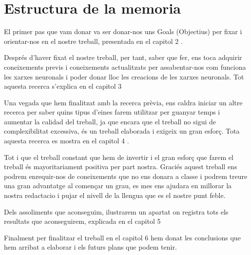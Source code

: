 \section{Estructura de la memoria}\label{sec:Estructura de la memoria}

El primer pas que vam donar va ser donar-nos uns Goals (Objectius) per fixar i orientar-nos en el nostre treball, presentada en el capitol 2 .

Després d'haver fixat el nostre treball, per tant, saber que fer, ens toca adquirir coneixements previs i coneixements actualitzats per assabentar-nos com funciona les xarxes neuronals i poder donar lloc les creacions de les xarxes neuronals. Tot aquesta recerca s'explica en el capitol 3 

Una vegada que hem finalitzat amb la recerca prèvia, ens caldra iniciar un altre recerca per saber quins tipus d'eines farem utilitzar per guanyar temps i aumentar la calidad del treball, ja que encara que el treball no sigui de complexibilitat excessiva, és un treball elaborada i exigeix un gran esforç. Tota aquesta recerca es mostra en el capitol 4 .

Tot i que el treball constant que hem de invertir i el gran esforç que farem el treball és mayoritariament positiva per part nostra. Graciés  aquest treball ens podrem enrequir-nos de coneixements que no ens donara a classe i podrem treure una gran advantatge al començar un grau, es mes ens ajudara en millorar la nostra redactacio i pujar el nivell de la llengua que es el nostre punt feble.

Dels assoliments que aconseguim, ilustrarem un apartat on registra tots els resultats que aconseguirem, explicada en el capitol 5 

Finalment per finalitzar el treball en el capitol 6  hem donat les conclusions que hem arribat a elaborar i els futurs plans que podem tenir.


